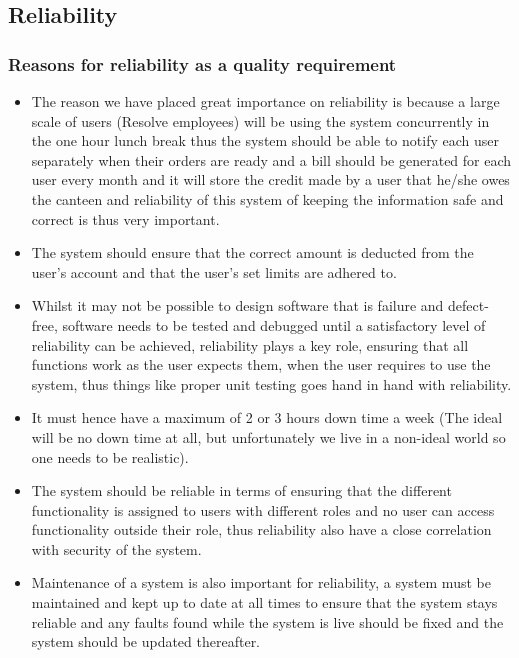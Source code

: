 \documentclass[a4paper,12pt]{article}
\begin{document}
\subsection{Reliability}
\subsubsection{Reasons for reliability as a quality requirement}
\begin{itemize}
\item The reason we have placed great importance on reliability is because a large scale of users (Resolve employees) will be using the system concurrently in the one hour lunch break thus the system should be able to notify each user separately when their orders are ready and a bill should be generated for each user every month and it  will store the credit made by a user that he/she owes the canteen and reliability of this system of keeping the information safe and correct is thus very important.
\item The system should ensure that the correct amount is deducted from the user's account and that the user's set limits are adhered to.
\item Whilst it may not be possible to design software that is failure and defect-free, software needs to be tested and debugged 
until a satisfactory level of reliability can be achieved, reliability plays a key role, ensuring that all functions work as the user expects them, when the user requires to use the system, thus things like proper unit testing goes hand in hand with reliability.
\item It must hence have a maximum of 2 or 3 hours down time a week (The ideal will be no down time at all, but unfortunately we live in a non-ideal world so one needs to be realistic).
\item The system should be reliable in terms of ensuring that the different functionality is assigned to users with different roles and no user can access functionality outside their role, thus reliability also have a close correlation with security of the system.  
\item Maintenance of a system is also important for reliability, a system must be maintained and kept up to date at all times to ensure that the system stays reliable and any faults found while the system is live should be fixed and the system should be updated thereafter.
\end{itemize}
\end{document}
